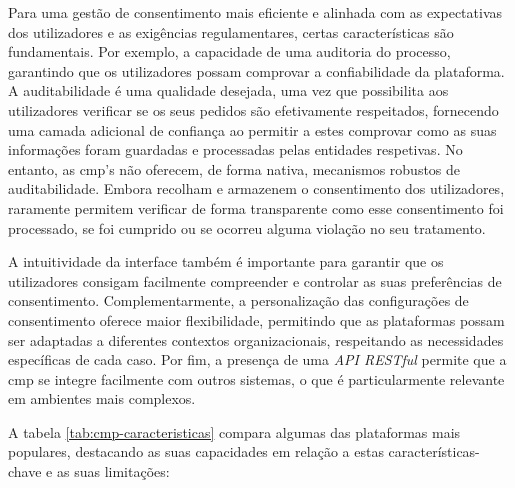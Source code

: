 Para uma gestão de consentimento mais eficiente e alinhada com as expectativas dos utilizadores e as exigências regulamentares, certas características são fundamentais.
Por exemplo, a capacidade de uma auditoria do processo, garantindo que os utilizadores possam comprovar a confiabilidade da plataforma.
A auditabilidade é uma qualidade desejada, uma vez que possibilita aos utilizadores verificar se os seus pedidos são efetivamente respeitados, fornecendo uma camada adicional de confiança ao permitir a estes comprovar como as suas informações foram guardadas e processadas pelas entidades respetivas.
No entanto, as \acrshort{cmp}'s não oferecem, de forma nativa, mecanismos robustos de auditabilidade. Embora recolham e armazenem o consentimento dos utilizadores, raramente permitem verificar de forma transparente como esse consentimento foi processado, se foi cumprido ou se ocorreu alguma violação no seu tratamento.

A intuitividade da interface também é importante para garantir que os utilizadores consigam facilmente compreender e controlar as suas preferências de consentimento.
Complementarmente, a personalização das configurações de consentimento oferece maior flexibilidade, permitindo que as plataformas possam ser adaptadas a diferentes contextos organizacionais, respeitando as necessidades específicas de cada caso.
Por fim, a presença de uma \textit{API RESTful} permite que a \acrshort{cmp} se integre facilmente com outros sistemas, o que é particularmente relevante em ambientes mais complexos.

A tabela \ref{tab:cmp-caracteristicas} compara algumas das plataformas mais populares, destacando as suas capacidades em relação a estas características-chave e as suas limitações:

